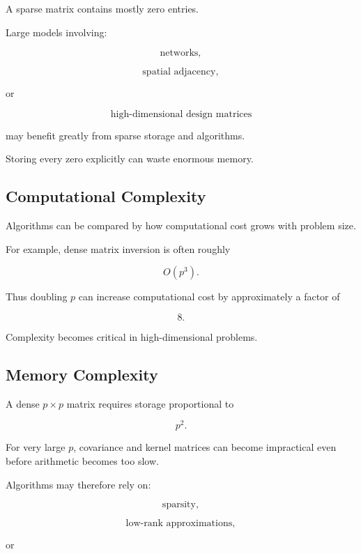 A sparse matrix contains mostly zero entries.

Large models involving:

\[
\boxed{
\text{networks},
}
\]

\[
\boxed{
\text{spatial adjacency},
}
\]

or

\[
\boxed{
\text{high-dimensional design matrices}
}
\]

may benefit greatly from sparse storage and algorithms.

Storing every zero explicitly can waste enormous memory.

\subsection{Computational Complexity}
\label{subsec:computational-complexity-statistics}

Algorithms can be compared by how computational cost grows with problem
size.

For example, dense matrix inversion is often roughly

\[
\boxed{
O(p^3).
}
\]

Thus doubling \(p\) can increase computational cost by approximately a
factor of

\[
\boxed{
8.
}
\]

Complexity becomes critical in high-dimensional problems.

\subsection{Memory Complexity}
\label{subsec:memory-complexity-statistics}

A dense \(p\times p\) matrix requires storage proportional to

\[
\boxed{
p^2.
}
\]

For very large \(p\), covariance and kernel matrices can become
impractical even before arithmetic becomes too slow.

Algorithms may therefore rely on:

\[
\boxed{
\text{sparsity},
}
\]

\[
\boxed{
\text{low-rank approximations},
}
\]

or


